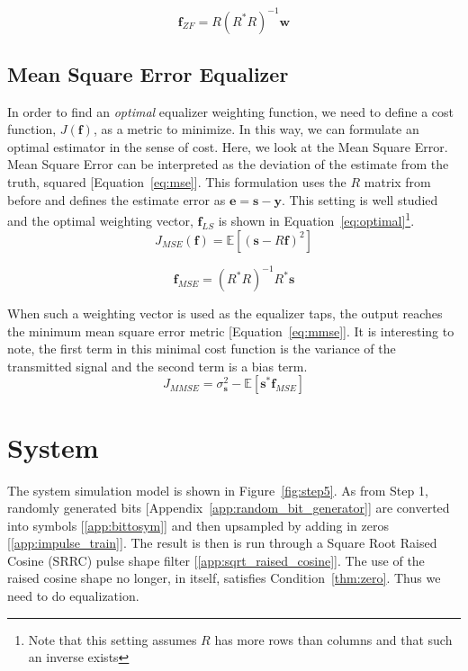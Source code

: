 \documentclass[]{article}
\begin{document}
\begin{equation}
\label{eq:zf} 
\mathbf{f}_{ZF} = R \left(R^{\ast}R \right)^{-1} \mathbf{w}
\end{equation}

\subsection{Mean Square Error Equalizer}
\label{sec:optimal}
In order to find an \emph{optimal} equalizer weighting function, we need to define a cost function, $J(\mathbf{f})$, as a metric to minimize.  In this way, we can formulate an optimal estimator in the sense of cost.  Here, we look at the Mean Square Error.  Mean Square Error can be interpreted as the deviation of the estimate from the truth, squared [Equation~\ref{eq:mse}].  This formulation uses the $R$ matrix from before and defines the estimate error as $\mathbf{e} = \mathbf{s} - \mathbf{y}$.  This setting is well studied and the optimal weighting vector, $\mathbf{f}_{LS}$ is shown in Equation~\ref{eq:optimal}\footnote{Note that this setting assumes $R$ has more rows than columns and that such an inverse exists}.
\begin{equation}
\label{eq:mse} 
J_{MSE} \left( \mathbf{f}\right) = \mathbb{E} \left[ \left(\mathbf{s} - R \mathbf{f} \right)^2 \right]
\end{equation}

\begin{equation}
\label{eq:optimal}
\mathbf{f}_{MSE} = \left(R^{\ast}R\right)^{-1}R^{\ast}\mathbf{s}
\end{equation}

When such a weighting vector is used as the equalizer taps, the output reaches the minimum mean square error metric  [Equation~\ref{eq:mmse}].  It is interesting to note, the first term in this minimal cost function is the variance of the transmitted signal and the second term is a bias term.
\begin{equation}
\label{eq:mmse}
J_{MMSE} =  \sigma_{\mathbf{s}}^{2} - \mathbb{E} \left[ \mathbf{s}^{\ast} \mathbf{f}_{MSE} \right]
\end{equation}

\newpage
\section{System}
\label{sec:system}
The system simulation model is shown in Figure~\ref{fig:step5}.  As from Step 1, randomly generated bits [Appendix~\ref{app:random_bit_generator}] are converted into symbols [\ref{app:bittosym}] and then upsampled by adding in zeros [\ref{app:impulse_train}].  The result is then is run through a Square Root Raised Cosine (SRRC) pulse shape filter [\ref{app:sqrt_raised_cosine}].  The use of the raised cosine shape no longer, in itself, satisfies Condition~\ref{thm:zero}.  Thus we need to do equalization.\\
\end{document}
